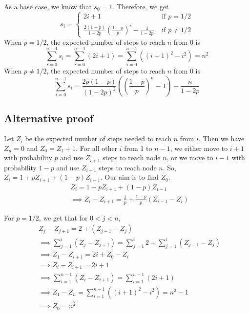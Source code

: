 As a base case, we know that $s_0 = 1$.
Therefore, we get
\[ s_i = \begin{cases} 2i + 1 & \textrm{ if } p = 1/2
\\ \frac{2(1-p)}{1-2p}\left(\frac{1-p}{p}\right)^i - \frac{1}{1-2p} & \textrm{ if } p \neq 1/2
\end{cases} \]
When $p = 1/2$, the expected number of steps to reach $n$ from $0$ is
\[ \sum_{i=0}^{n-1} s_i = \sum_{i=0}^{n-1} (2i+1)
= \sum_{i=0}^{n-1} ((i+1)^2 - i^2) = n^2 \]
When $p \neq 1/2$, the expected number of steps to reach $n$ from $0$ is
\[ \sum_{i=0}^{n-1} s_i
= \frac{2p(1-p)}{(1-2p)^2}\left(\left(\frac{1-p}{p}\right)^n - 1\right) - \frac{n}{1-2p} \]

\subsection{Alternative proof}

Let $Z_i$ be the expected number of steps needed to reach $n$ from $i$.
Then we have $Z_n = 0$ and $Z_0 = Z_1 + 1$. For all other $i$ from 1 to $n-1$,
we either move to $i+1$ with probability $p$ and use $Z_{i+1}$ steps to reach node $n$,
or we move to $i-1$ with probability $1-p$ and use $Z_{i-1}$ steps to reach node $n$.
So, $Z_i = 1 + pZ_{i+1} + (1-p)Z_{i-1}$. Our aim is to find $Z_0$.
\begin{align*}
& Z_i = 1 + pZ_{i+1} + (1-p)Z_{i-1}
\\ &\implies Z_i - Z_{i+1} = \frac{1}{p} + \frac{1-p}{p}(Z_{i-1} - Z_i)
\end{align*}

For $p = 1/2$, we get that for $0 < j < n$,
\begin{align*}
& Z_j - Z_{j+1} = 2 + (Z_{j-1} - Z_j)
\\ &\implies \sum_{j=1}^i (Z_j - Z_{j+1}) = \sum_{j=1}^i 2 + \sum_{j=1}^i (Z_{j-1} - Z_j)
\\ &\implies Z_1 - Z_{i+1} = 2i + Z_{0} - Z_i
\\ &\implies Z_i - Z_{i+1} = 2i + 1
\\ &\implies \sum_{i=1}^{n-1} (Z_i - Z_{i+1}) = \sum_{i=1}^{n-1} (2i + 1)
\\ &\implies Z_1 - Z_n = \sum_{i=1}^{n-1} ((i+1)^2 - i^2) = n^2 - 1
\\ &\implies Z_0 = n^2
\end{align*}



